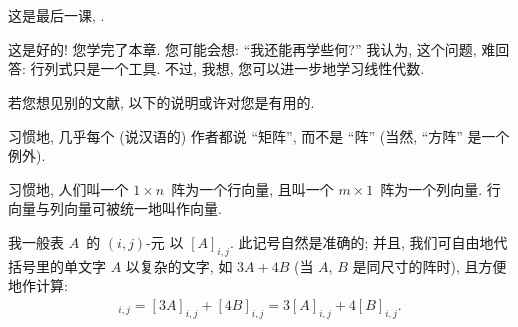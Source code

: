 \documentclass[../libro.tex]{subfiles}
\begin{document}

\KunAsteriskoEnEnhavtabelo
\section{}
\SenAsteriskoEnEnhavtabelo

\maldevigalegajxo

这是最后一课, .

这是好的!
您学完了本章.
您可能会想:
``我还能再学些何?''
我认为, 这个问题, 难回答:
行列式只是一个工具.
不过, 我想,
您可以进一步地学习线性代数.

若您想见别的文献,
以下的说明或许对您是有用的.

习惯地, 几乎每个 (说汉语的) 作者都说 ``矩阵'',
而不是 ``阵''
(当然, ``方阵'' 是一个例外).

习惯地, 人们叫一个 \(1 \times n\)~阵为一个行向量,
且叫一个 \(m \times 1\)~阵为一个列向量.
行向量与列向量可被统一地叫作向量.

我一般表
\(A\)~的 \((i, j)\)-元%
以 \([A]_{i,j}\).
此记号自然是准确的;
并且,
我们可自由地代括号里的单文字 \(A\)
以复杂的文字, 如 \(3A + 4B\)
(当 \(A\), \(B\) 是同尺寸的阵时),
且方便地作计算:
\begin{align*}
    [3A + 4B]_{i,j}
    = [3A]_{i,j} + [4B]_{i,j}
    = 3[A]_{i,j} + 4[B]_{i,j}.
\end{align*}
\end{document}
